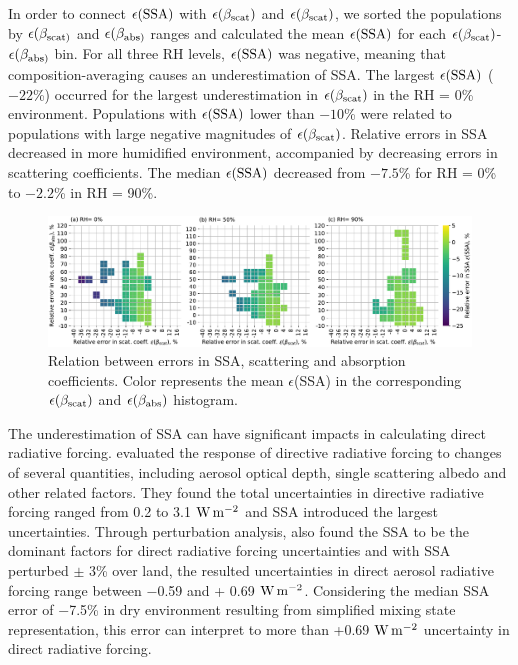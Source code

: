 \documentclass[edeposit,fullpage]{uiucthesis2009}
\makeatletter
\newcommand{\jcedits}[1]{{\color{blue} #1}}
\DeclareRobustCommand*\unit[1]
 {\ensuremath{%
   {\thinmuskip3mu\relax
    \def\mu{\text{\textmu}}\def~{\,}%
    \ifx\f@series\testbx\mathbf{#1}\else\mathrm{#1}\fi}}}
\makeatother
\begin{document}
In order to connect $\epsilon(\rm SSA)$ with $\epsilon(\beta_{\rm
  scat})$ and $\epsilon(\beta_{\rm scat})$, we sorted the populations
by $\epsilon(\beta_{\rm scat)}$ and $\epsilon(\beta_{\rm abs)}$ ranges
and calculated the mean $\epsilon(\rm SSA)$ for each
$\epsilon(\beta_{\rm scat})$-$\epsilon(\beta_{\rm abs)}$ bin. For all
three RH levels, $\epsilon(\rm SSA)$ was negative, meaning that
composition-averaging causes an underestimation of SSA. The largest
$\epsilon(\rm SSA)$ ($-22$\%) occurred for the largest underestimation
in $\epsilon(\beta_{\rm scat})$ in the RH = 0\%
environment. Populations with $\epsilon(\rm SSA)$ lower than $-10$\%
were related to populations with large negative magnitudes of
$\epsilon(\beta_{\rm scat})$. Relative errors in SSA decreased in more
humidified environment, accompanied by decreasing errors in scattering
coefficients. The median $\epsilon(\rm SSA)$ decreased from $-7.5$\%
for RH = 0\% to $-2.2$\% in RH = 90\%.

\begin{figure}
	\centering
	\includegraphics[scale=0.50]{chap4_figs/fig10.pdf}
	\caption{Relation between errors in SSA, scattering and
          absorption coefficients. Color represents the mean
          $\epsilon$(SSA) in the corresponding $\epsilon(\beta_{\rm
            scat})$ and $\epsilon(\beta_{\rm \rm abs})$ histogram.}
	\label{fig12:ssa-err}
\end{figure}

The underestimation of SSA can have significant impacts in calculating
direct radiative forcing. \citet{mccomiskey2008direct} evaluated the
response of directive radiative forcing to changes of several
quantities, including aerosol optical depth, single
scattering albedo and other related factors. They found the total
uncertainties in directive radiative forcing ranged from 0.2 to 3.1
\unit{W\,m^{-2}} and SSA introduced the largest uncertainties. \jcedits{Through
perturbation analysis, \citet{loeb2010direct} also found the SSA to be
the dominant factors for direct radiative forcing uncertainties and
with SSA perturbed $\pm$ 3\% over land, the
resulted uncertainties in direct aerosol radiative forcing range
between $-$0.59 and + 0.69 \unit{W\,m^{-2}}. Considering the median SSA error of
$-$7.5\% in dry environment resulting from simplified mixing state representation, this error 
can interpret to more than +0.69 \unit{W\,m^{-2}} uncertainty in direct radiative forcing.}
\end{document}
